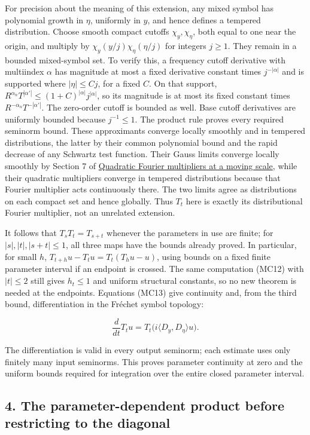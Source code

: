 \documentclass[
  11pt,
]{article}
\begin{document}
For precision about the meaning of this extension, any mixed symbol has
polynomial growth in \(\eta\), uniformly in \(y\), and hence defines a
tempered distribution. Choose smooth compact cutoffs
\(\chi_y,\chi_\eta\), both equal to one near the origin, and multiply by
\(\chi_y(y/j)\chi_\eta(\eta/j)\) for integers \(j\geq1\). They remain in
a bounded mixed-symbol set. To verify this, a frequency cutoff
derivative with multiindex \(\alpha\) has magnitude at most a fixed
derivative constant times \(j^{-|\alpha|}\) and is supported where
\(|\eta|\leq Cj\), for a fixed \(C\). On that support,
\(R^{\alpha_n}T^{|\alpha'|}\leq(1+C)^{|\alpha|}j^{|\alpha|}\), so its
magnitude is at most its fixed constant times
\(R^{-\alpha_n}T^{-|\alpha'|}\). The zero-order cutoff is bounded as
well. Base cutoff derivatives are uniformly bounded because
\(j^{-1}\leq1\). The product rule proves every required seminorm bound.
These approximants converge locally smoothly and in tempered
distributions, the latter by their common polynomial bound and the rapid
decrease of any Schwartz test function. Their Gauss limits converge
locally smoothly by Section 7 of
\href{gauss-transform-estimates.pdf}{Quadratic Fourier multipliers at a
moving scale}, while their quadratic multipliers converge in tempered
distributions because that Fourier multiplier acts continuously there.
The two limits agree as distributions on each compact set and hence
globally. Thus \(T_t\) here is exactly its distributional Fourier
multiplier, not an unrelated extension.

It follows that \(T_sT_t=T_{s+t}\) whenever the parameters in use are
finite; for \(|s|,|t|,|s+t|\leq1\), all three maps have the bounds
already proved. In particular, for small \(h\),
\(T_{t+h}u-T_tu=T_t(T_hu-u)\), using bounds on a fixed finite parameter
interval if an endpoint is crossed. The same computation (MC12) with
\(|t|\leq2\) still gives \(h_t\leq1\) and uniform structural constants,
so no new theorem is needed at the endpoints. Equations (MC13) give
continuity and, from the third bound, differentiation in the Fréchet
symbol topology:

\[
\frac{d}{dt}T_tu=T_t\bigl(i\langle D_y,D_\eta\rangle u\bigr).
\tag{MC14}
\]

The differentiation is valid in every output seminorm; each estimate
uses only finitely many input seminorms. This proves parameter
continuity at zero and the uniform bounds required for integration over
the entire closed parameter interval.

\subsection{4. The parameter-dependent product before restricting to the
diagonal}\label{the-parameter-dependent-product-before-restricting-to-the-diagonal}
\end{document}
